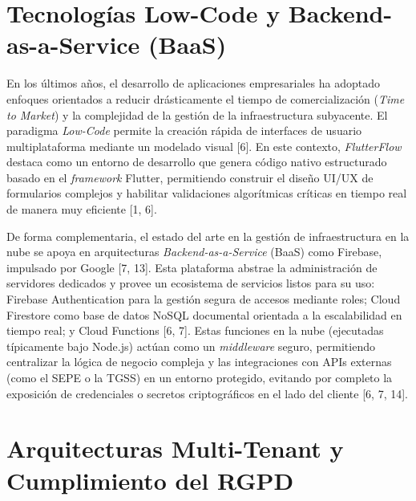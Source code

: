 
\section{Tecnologías Low-Code y Backend-as-a-Service (BaaS)} \label{sct:state:lowcode_baas}

En los últimos años, el desarrollo de aplicaciones empresariales ha adoptado enfoques orientados a reducir drásticamente el tiempo de comercialización (\textit{Time to Market}) y la complejidad de la gestión de la infraestructura subyacente. El paradigma \textit{Low-Code} permite la creación rápida de interfaces de usuario multiplataforma mediante un modelado visual \cite{documento_diseno} [6]. En este contexto, \textit{FlutterFlow} destaca como un entorno de desarrollo que genera código nativo estructurado basado en el \textit{framework} Flutter, permitiendo construir el diseño UI/UX de formularios complejos y habilitar validaciones algorítmicas críticas en tiempo real de manera muy eficiente \cite{documento_diseno, primera_entrega} [1, 6].

De forma complementaria, el estado del arte en la gestión de infraestructura en la nube se apoya en arquitecturas \textit{Backend-as-a-Service} (BaaS) como Firebase, impulsado por Google \cite{proyecto_alta} [7, 13]. Esta plataforma abstrae la administración de servidores dedicados y provee un ecosistema de servicios listos para su uso: Firebase Authentication para la gestión segura de accesos mediante roles; Cloud Firestore como base de datos NoSQL documental orientada a la escalabilidad en tiempo real; y Cloud Functions \cite{documento_diseno, proyecto_alta} [6, 7]. Estas funciones en la nube (ejecutadas típicamente bajo Node.js) actúan como un \textit{middleware} seguro, permitiendo centralizar la lógica de negocio compleja y las integraciones con APIs externas (como el SEPE o la TGSS) en un entorno protegido, evitando por completo la exposición de credenciales o secretos criptográficos en el lado del cliente \cite{documento_diseno, proyecto_alta} [6, 7, 14].


\section{Arquitecturas Multi-Tenant y Cumplimiento del RGPD} \label{sct:state:multitenant_rgpd}

